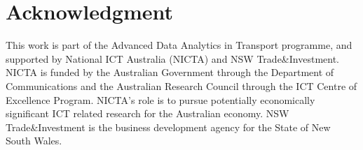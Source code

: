 \section*{Acknowledgment}

%
This work is part of the Advanced Data Analytics in Transport programme, and
supported by National ICT Australia (NICTA) and NSW Trade\&Investment. NICTA is
funded by the Australian Government through the Department of Communications and
the Australian Research Council through the ICT Centre of Excellence Program.
NICTA's role is to pursue potentially economically significant ICT related
research for the Australian economy. NSW Trade\&Investment is the business
development agency for the State of New South Wales.
